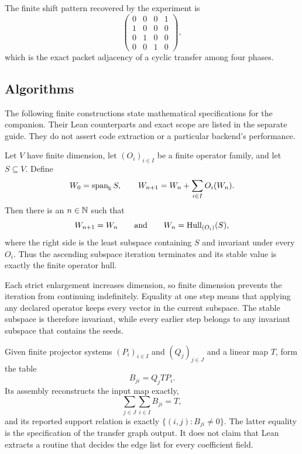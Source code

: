 The finite shift pattern recovered by the experiment is
\[
\begin{pmatrix}
0&0&0&1\\
1&0&0&0\\
0&1&0&0\\
0&0&1&0
\end{pmatrix},
\]
which is the exact packet adjacency of a cyclic transfer among four phases.

\subsection{Algorithms}

The following finite constructions state mathematical specifications for the companion. Their Lean counterparts and exact scope are listed in the separate guide. They do not assert code extraction or a particular backend's performance.

\begin{construction}
\label{con:orbit-hull-algorithm}
Let $V$ have finite dimension, let $(O_i)_{i\in I}$ be a finite operator
family, and let $S\subseteq V$.  Define
\[
W_0=\operatorname{span}_{\Bbbk}S,
\qquad
W_{n+1}=W_n+\sum_{i\in I}O_i(W_n).
\]
Then there is an $n\in\mathbb N$ such that
\[
W_{n+1}=W_n
\qquad\text{and}\qquad
W_n=\operatorname{Hull}_{(O_i)}(S),
\]
where the right side is the least subspace containing $S$ and invariant under
every $O_i$.  Thus the ascending subspace iteration terminates and its stable
value is exactly the finite operator hull.

Each strict enlargement increases dimension, so finite dimension prevents the iteration from continuing indefinitely. Equality at one step means that applying any declared operator keeps every vector in the current subspace. The stable subspace is therefore invariant, while every earlier step belongs to any invariant subspace that contains the seeds.
\end{construction}

\begin{construction}
\label{con:transfer-block-algorithm}
Given finite projector systems $(P_i)_{i\in I}$ and $(Q_j)_{j\in J}$ and a
linear map $T$, form the table
\[
B_{ji}=Q_jTP_i.
\]
Its assembly reconstructs the input map exactly,
\[
\sum_{j\in J}\sum_{i\in I}B_{ji}=T,
\]
and its reported support relation is exactly
$\{(i,j):B_{ji}\ne0\}$.  The latter equality is the specification of the
transfer graph output. It does not claim that Lean extracts a routine that decides the edge list for every coefficient field.
\end{construction}

